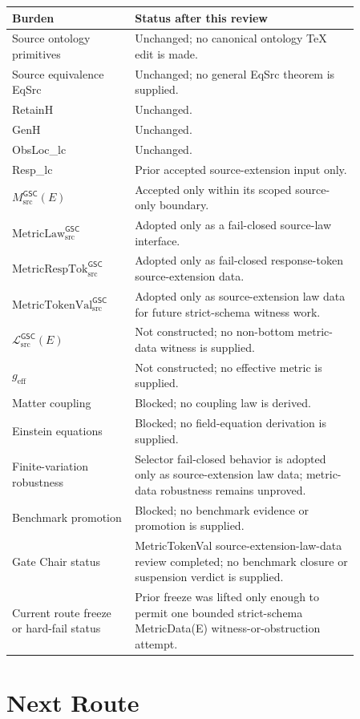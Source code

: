 \documentclass[11pt]{article}
\newcommand{\MsrcGSC}{M_{\mathrm{src}}^{\mathsf{GSC}}}
\newcommand{\MetricLaw}{\mathrm{MetricLaw}_{\mathrm{src}}^{\mathsf{GSC}}}
\newcommand{\MetricRespTok}{\mathrm{MetricRespTok}_{\mathrm{src}}^{\mathsf{GSC}}}
\newcommand{\MetricTokenVal}{\mathrm{MetricTokenVal}_{\mathrm{src}}^{\mathsf{GSC}}}
\newcommand{\MetricData}{\mathcal{L}_{\mathrm{src}}^{\mathsf{GSC}}}
\newcommand{\geff}{g_{\mathrm{eff}}}
\begin{document}
\begin{longtable}{p{0.30\linewidth}p{0.56\linewidth}}
\toprule
Burden & Status after this review \\
\midrule
Source ontology primitives & Unchanged; no canonical ontology TeX edit is made. \\
Source equivalence EqSrc & Unchanged; no general EqSrc theorem is supplied. \\
RetainH & Unchanged. \\
GenH & Unchanged. \\
ObsLoc\_lc & Unchanged. \\
Resp\_lc & Prior accepted source-extension input only. \\
\(\MsrcGSC(E)\) & Accepted only within its scoped source-only boundary. \\
\(\MetricLaw\) & Adopted only as a fail-closed source-law interface. \\
\(\MetricRespTok\) & Adopted only as fail-closed response-token source-extension data. \\
\(\MetricTokenVal\) & Adopted only as source-extension law data for future strict-schema witness work. \\
\(\MetricData(E)\) & Not constructed; no non-bottom metric-data witness is supplied. \\
\(\geff\) & Not constructed; no effective metric is supplied. \\
Matter coupling & Blocked; no coupling law is derived. \\
Einstein equations & Blocked; no field-equation derivation is supplied. \\
Finite-variation robustness & Selector fail-closed behavior is adopted only as source-extension law data; metric-data robustness remains unproved. \\
Benchmark promotion & Blocked; no benchmark evidence or promotion is supplied. \\
Gate Chair status & MetricTokenVal source-extension-law-data review completed; no benchmark closure or suspension verdict is supplied. \\
Current route freeze or hard-fail status & Prior freeze was lifted only enough to permit one bounded strict-schema MetricData(E) witness-or-obstruction attempt. \\
\bottomrule
\end{longtable}

\section{Next Route}
\end{document}
